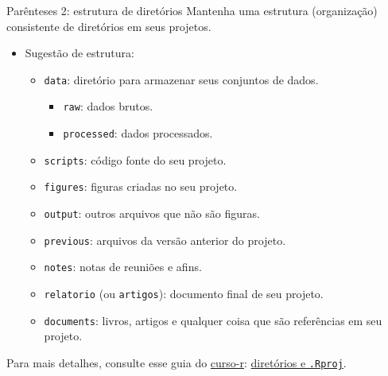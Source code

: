 \documentclass[
  10pt,
  ignorenonframetext,
]{beamer}
\providecommand{\tightlist}{%
  \setlength{\itemsep}{0pt}\setlength{\parskip}{0pt}}
\begin{document}
\begin{frame}[fragile]{Parênteses 2: estrutura de diretórios}
\protect\hypertarget{paruxeanteses-2-estrutura-de-diretuxf3rios}{}
Mantenha uma estrutura (organização) consistente de diretórios em seus
projetos.

\begin{itemize}
\tightlist
\item
  Sugestão de estrutura:

  \begin{itemize}
  \tightlist
  \item
    \texttt{data}: diretório para armazenar seus conjuntos de dados.

    \begin{itemize}
    \tightlist
    \item
      \texttt{raw}: dados brutos.
    \item
      \texttt{processed}: dados processados.
    \end{itemize}
  \item
    \texttt{scripts}: código fonte do seu projeto.
  \item
    \texttt{figures}: figuras criadas no seu projeto.
  \item
    \texttt{output}: outros arquivos que não são figuras.
  \item
    \texttt{previous}: arquivos da versão anterior do projeto.
  \item
    \texttt{notes}: notas de reuniões e afins.
  \item
    \texttt{relatorio} (ou \texttt{artigos}): documento final de seu
    projeto.
  \item
    \texttt{documents}: livros, artigos e qualquer coisa que são
    referências em seu projeto.
  \end{itemize}
\end{itemize}

Para mais detalhes, consulte esse guia do
\href{https://curso-r.com}{curso-r}:
\href{https://curso-r.github.io/zen-do-r/rproj-dir.html}{diretórios e
\texttt{.Rproj}}.
\end{frame}
\end{document}
